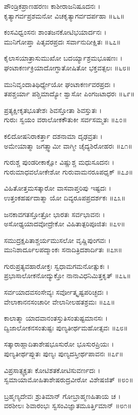 ಪೌಂಡ್ರಿಕಪ್ರಾಣಹರಣಃ ಕಾಶೀರಾಜನಿಷೂದನಃ ।\\
ಕೃತ್ಯಾಗರ್ವಪ್ರಶಮನೋ ವಿಚಕೃತ್ಯಾಗರ್ವದರ್ಪಹಾ ॥೬೬॥

ಕಂಸವಿಧ್ವಂಸನಃ ಶಾಂತಜನಕೋಟಿಭಯಾರ್ದನಃ ।\\
ಮುನಿಗೋಪ್ತಾ ಪಿತೃವರಪ್ರದಃ ಸರ್ವಾನುದೀಕ್ಷಿತಃ ॥೬೭॥

ಕೈಲಾಸಯಾತ್ರಾಸುಮುಖೋ ಬದರ್ಯ್ಯಾಶ್ರಮಭೂಷಣಃ ।\\
ಘಂಟಾಕರ್ಣಕ್ರಿಯಾದೋಗ್ಧಾತೋಷಿತೋ ಭಕ್ತವತ್ಸಲಃ ॥೬೮॥

ಮುನಿವೃಂದಾತಿಥಿರ್ಧ್ಯೇಯೋ ಘಂಟಾಕರ್ಣವರಪ್ರದಃ ।\\
ತಪಶ್ಚರ್ಯಾ ಪಶ್ಚಿಮಾದ್ಯೋ ಶ್ವಾಸೋ ಪಿಂಗಜಟಾಧರಃ ॥೬೯॥

ಪ್ರತ್ಯಕ್ಷೀಕೃತಭೂತೇಶಃ ಶಿವಸ್ತೋತಾ ಶಿವಸ್ತುತಃ ।\\
ಗುರುಃ ಸ್ವಯಂ ವರಾಲೋಕಕೌತುಕೀ ಸರ್ವಸಮ್ಮತಃ ॥೭೦॥

ಕಲಿದೋಷನಿರಾಕರ್ತ್ತಾ ದಶನಾಮಾ ದೃಢವ್ರತಃ ।\\
ಅಮೇಯಾತ್ಮಾ ಜಗತ್ಸ್ವಾಮೀ ವಾಗ್ಮೀ ಚೈದ್ಯಶಿರೋಹರಃ ॥೭೧॥

ಗುರುಶ್ಚ ಪುಂಡರೀಕಾಕ್ಷೋ ವಿಷ್ಣುಶ್ಚ ಮಧುಸೂದನಃ ।\\
ಗುರುಮಾಧವಲೋಕೇಶೋ ಗುರುವಾಮನರೂಪಧೃಕ್ ॥೭೨॥

ವಿಹಿತೋತ್ತಮಸತ್ಕಾರೋ ವಾಸವಾಪ್ತರಿಪು ಇಷ್ಟದಃ ।\\
ಉತ್ತಂಕಹರ್ಷದಾತ್ಮಾ ಯೋ ದಿವ್ಯರೂಪಪ್ರದರ್ಶಕಃ ॥೭೩॥

ಜನಕಾವಗತಸ್ತೋತ್ರೋ ಭಾರತಃ ಸರ್ವಭಾವನಃ ।\\
ಅಸೋಢ್ಯಯಾದವೋದ್ರೇಕೋ ವಿಹಿತಾತ್ಪರಿಪೂಜಿತಃ ॥೭೪॥

ಸಮುದ್ರಕ್ಷಪಿತಾಶ್ಚರ್ಯಮುಸಲೋ ವೃಷ್ಣಿಪುಂಗವಃ ।\\
ಮುನಿಶಾರ್ದೂಲಪದ್ಮಾಂಕಃ ಸನಾದಿತ್ರಿದಶಾರ್ದಿತಃ ॥೭೫॥

ಗುರುಪ್ರತ್ಯವಹಾರೋಕ್ತಃ ಸ್ವಧಾಮಗಮನೋತ್ಸುಕಃ ।\\
ಪ್ರಭಾಸಾಲೋಕನೋದ್ಯುಕ್ತೋ ನಾನಾವಿಧನಿಮಿತ್ತಕೃತ್ ॥೭೬॥

ಸರ್ವಯಾದವಸಂಸೇವ್ಯಃ ಸರ್ವೋತ್ಕೃಷ್ಟಪರಿಚ್ಛದಃ ।\\
ವೇಲಾಕಾನನಸಂಚಾರೀ ವೇಲಾನೀಲಹತಶ್ರಮಃ ॥೭೭॥

ಕಾಲಾತ್ಮಾ ಯಾದವಾನಂತಸ್ತುತಿಸಂತುಷ್ಟಮಾನಸಃ ।\\
ದ್ವಿಜಾಲೋಕನಸಂತುಷ್ಟಃ ಪುಣ್ಯತೀರ್ಥಮಹೋತ್ಸವಃ ॥೭೮॥

ಸತ್ಕಾರಾಹ್ಲಾದಿತಾಶೇಷಭೂಸುರೋ ಭೂಸುರಪ್ರಿಯಃ ।\\
ಪುಣ್ಯತೀರ್ಥಪ್ಲುತಃ ಪುಣ್ಯಃ ಪುಣ್ಯದಸ್ತೀರ್ಥಪಾವನಃ ॥೭೯॥

ವಿಪ್ರಸಾತ್ಸ್ವಕೃತಃ ಕೋಟಿಶತಕೋಟಿಸುವರ್ಣದಃ ।\\
ಸ್ವಮಾಯಾಮೋಹಿತಾಶೇಷರುದ್ರವೀರೋ ವಿಶೇಷಜಿತ್ ॥೮೦॥

ಬ್ರಹ್ಮಣ್ಯದೇವಃ ಶ್ರುತಿಮಾನ್ ಗೋಬ್ರಾಹ್ಮಣಹಿತಾಯ ಚ ।\\
ವರಶೀಲಃ ಶಿವಾರಂಭಃ ಸ್ವಸಂವಿಜ್ಞಾತಮೂರ್ತ್ತಿಮಾನ್ ॥೮೧॥

